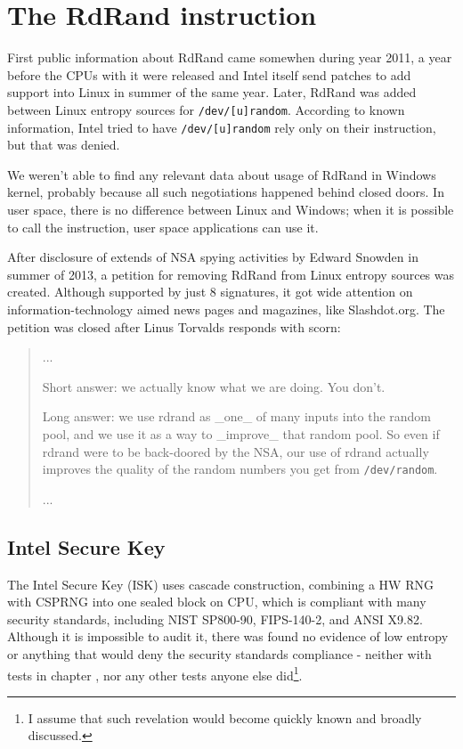 \chapter{The RdRand instruction}  \label{chap:rdrand-instruction}
First public information about RdRand came somewhen during year 2011\cite{IntelRdRandFindAbout}, a year before the CPUs with it were released and Intel itself send patches to add support into Linux in summer of the same year\cite{KernelRdRand}. Later, RdRand was added between Linux entropy sources for {\tt /dev/[u]random}.%
According to known information\cite{TheodoreTsoNSA}, Intel tried to have {\tt /dev/[u]random} rely only on their instruction, but that was denied. 

We weren't able to find any relevant data about usage of RdRand in Windows kernel, probably because all such negotiations happened behind closed doors. In user space, there is no difference between Linux and Windows; when it is possible to call the instruction, user space applications can use it. 

After disclosure of extends of NSA spying activities by Edward Snowden in summer of 2013\cite{GuardianNSA}\cite{DailymailNSA}, a petition for removing RdRand from Linux entropy sources was created\cite{PetitionRdRand}. Although supported by just 8 signatures, it got wide attention on information-technology aimed news pages and magazines, like Slashdot.org\cite{PetitionRdRandSlashdot}. The petition was closed after Linus Torvalds responds with scorn:

\begin{quote} ...

Short answer: we actually know what we are doing. You don't.

Long answer: we use rdrand as \_one\_ of many inputs into the random pool, and we use it as a way to \_improve\_ that random pool. So even if rdrand were to be back-doored by the NSA, our use of rdrand actually improves the quality of the random numbers you get from {\tt /dev/random}.

...
\end{quote}


\section{Intel Secure Key} \label{sec:intel-secure-key}
The Intel Secure Key (ISK) uses cascade construction, combining a HW RNG with CSPRNG into one sealed block on CPU, which is compliant with many security standards, including NIST SP800-90, FIPS-140-2, and ANSI X9.82\cite{IntelDRNGGuide}. Although it is impossible to audit it, there was found no evidence of low entropy or anything that would deny the security standards compliance - neither with tests in chapter , nor any other tests anyone else did\footnote{I assume that such revelation would become quickly known and broadly discussed.}.

